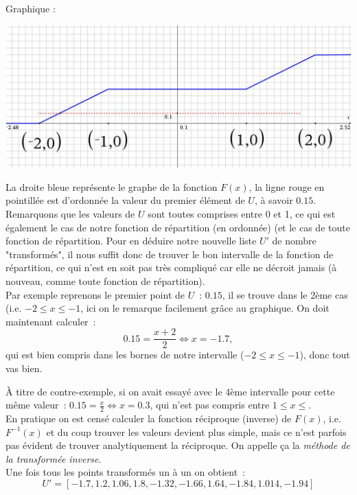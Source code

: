\documentclass[11pt,a4paper]{report}
\begin{document}
			Graphique :

			\includegraphics[width=\textwidth]{monte-carlo-fonction-distribution}

			La droite bleue représente le graphe de la fonction $F(x)$, la ligne rouge en pointillée est d'ordonnée la valeur du premier élément de $U$, à savoir $0.15$. \\

			Remarquons que les valeurs de $U$ sont toutes comprises entre 0 et 1, ce qui est également le cas de notre fonction de répartition (en ordonnée) (et le cas de toute fonction de répartition.
			Pour en déduire notre nouvelle liste $U'$ de nombre "transformés", il nous suffit donc de trouver le bon intervalle de la fonction de répartition, ce qui n'est en soit pas très compliqué car
			elle ne décroit jamais (à nouveau, comme toute fonction de répartition). \\

			Par exemple reprenons le premier point de $U$~: $0.15$, il se trouve dans le 2ème cas (i.e. $-2 \leq x \leq -1$, ici on le remarque facilement grâce au graphique. On doit maintenant calculer~:
			\[0.15 = \frac{x+2}{2} \Leftrightarrow x = -1.7,\]
			qui est bien compris dans les bornes de notre intervalle ($-2 \leq x \leq -1$), donc tout vas bien.

			À titre de contre-exemple, si on avait essayé avec le 4ème intervalle pour cette même valeur~: $0.15 = \frac{x}{2} \Leftrightarrow x = 0.3 $, qui n'est pas compris entre $1 \leq x \leq$.\\

			En pratique on est censé calculer la fonction réciproque (inverse) de $F(x)$, i.e. $F^{-1}(x)$ et du coup trouver les valeurs devient plus simple, mais ce n'est parfois pas évident de trouver analytiquement
			la réciproque. On appelle ça la \emph{méthode de la transformée inverse}.\\

			Une fois tous les points transformés un à un on obtient~:
			\[
				U' = [-1.7, 1.2, 1.06, 1.8, -1.32, -1.66, 1.64, -1.84, 1.014, -1.94]
			\]\\
\end{document}
